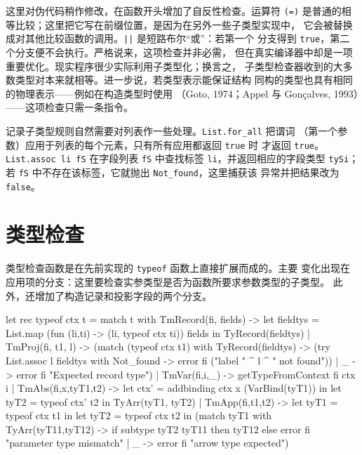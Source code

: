 这里对伪代码稍作修改，在函数开头增加了自反性检查。运算符 \texttt{(=)}
是普通的相等比较；这里把它写在前缀位置，是因为在另外一些子类型实现中，
它会被替换成对其他比较函数的调用。\texttt{||} 是短路布尔“或”：若第一个
分支得到 \texttt{true}，第二个分支便不会执行。严格说来，这项检查并非必需，
但在真实编译器中却是一项重要优化。现实程序很少实际利用子类型化；换言之，
子类型检查器收到的大多数类型对本来就相等。进一步说，若类型表示能保证结构
同构的类型也具有相同的物理表示——例如在构造类型时使用
（Goto, 1974；Appel 与 Gonçalves,
1993）——这项检查只需一条指令。


记录子类型规则自然需要对列表作一些处理。\texttt{List.for\_all} 把谓词
（第一个参数）应用于列表的每个元素，只有所有应用都返回 \texttt{true} 时
才返回 \texttt{true}。\texttt{List.assoc li fS} 在字段列表 \texttt{fS}
中查找标签 \texttt{li}，并返回相应的字段类型 \texttt{tySi}；若
\texttt{fS} 中不存在该标签，它就抛出 \texttt{Not\_found}，这里捕获该
异常并把结果改为 \texttt{false}。

\section{类型检查}
\label{sec:17.3}

类型检查函数是在先前实现的 \texttt{typeof} 函数上直接扩展而成的。主要
变化出现在应用项的分支：这里要检查实参类型是否为函数所要求参数类型的子类型。
此外，还增加了构造记录和投影字段的两个分支。

\begin{taplocamlcode}
let rec typeof ctx t =
  match t with
    TmRecord(fi, fields) ->
      let fieldtys =
        List.map (fun (li,ti) -> (li, typeof ctx ti)) fields in
      TyRecord(fieldtys)
  | TmProj(fi, t1, l) ->
      (match (typeof ctx t1) with
         TyRecord(fieldtys) ->
           (try List.assoc l fieldtys
            with Not_found -> error fi ("label " ^ l ^ " not found"))
       | _ -> error fi "Expected record type")
  | TmVar(fi,i,_) -> getTypeFromContext fi ctx i
  | TmAbs(fi,x,tyT1,t2) ->
      let ctx' = addbinding ctx x (VarBind(tyT1)) in
      let tyT2 = typeof ctx' t2 in
      TyArr(tyT1, tyT2)
  | TmApp(fi,t1,t2) ->
      let tyT1 = typeof ctx t1 in
      let tyT2 = typeof ctx t2 in
      (match tyT1 with
         TyArr(tyT11,tyT12) ->
           if subtype tyT2 tyT11 then tyT12
           else error fi "parameter type mismatch"
       | _ -> error fi "arrow type expected")
\end{taplocamlcode}

